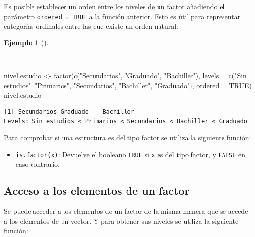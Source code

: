 \documentclass[
  a4paper,
]{scrreport}
\newenvironment{Shaded}{\begin{snugshade}}{\end{snugshade}}
\newcommand{\AttributeTok}[1]{\textcolor[rgb]{0.40,0.45,0.13}{#1}}
\newcommand{\ConstantTok}[1]{\textcolor[rgb]{0.56,0.35,0.01}{#1}}
\newcommand{\FunctionTok}[1]{\textcolor[rgb]{0.28,0.35,0.67}{#1}}
\newcommand{\NormalTok}[1]{\textcolor[rgb]{0.00,0.23,0.31}{#1}}
\newcommand{\OtherTok}[1]{\textcolor[rgb]{0.00,0.23,0.31}{#1}}
\newcommand{\StringTok}[1]{\textcolor[rgb]{0.13,0.47,0.30}{#1}}
\providecommand{\tightlist}{%
  \setlength{\itemsep}{0pt}\setlength{\parskip}{0pt}}\usepackage{longtable,booktabs,array}
\theoremstyle{definition}
\theoremstyle{definition}
\newtheorem{example}{Ejemplo}[chapter]
\theoremstyle{remark}
\begin{document}
Es posible establecer un orden entre los niveles de un factor añadiendo
el parámetro \texttt{ordered\ =\ TRUE} a la función anterior. Esto es
útil para representar categorías ordinales entre las que existe un orden
natural.

\begin{example}[]\protect\hypertarget{exm-creacion-factor-ordenado}{}\label{exm-creacion-factor-ordenado}

~

\begin{Shaded}
\begin{Highlighting}[]
\NormalTok{nivel.estudio }\OtherTok{\textless{}{-}} \FunctionTok{factor}\NormalTok{(}\FunctionTok{c}\NormalTok{(}\StringTok{"Secundarios"}\NormalTok{, }\StringTok{"Graduado"}\NormalTok{, }\StringTok{"Bachiller"}\NormalTok{), }\AttributeTok{levels =} \FunctionTok{c}\NormalTok{(}\StringTok{"Sin estudios"}\NormalTok{, }\StringTok{"Primarios"}\NormalTok{, }\StringTok{"Secundarios"}\NormalTok{, }\StringTok{"Bachiller"}\NormalTok{, }\StringTok{"Graduado"}\NormalTok{), }\AttributeTok{ordered =} \ConstantTok{TRUE}\NormalTok{)}
\NormalTok{nivel.estudio}
\end{Highlighting}
\end{Shaded}

\begin{verbatim}
[1] Secundarios Graduado    Bachiller  
Levels: Sin estudios < Primarios < Secundarios < Bachiller < Graduado
\end{verbatim}

\end{example}

Para comprobar si una estructura es del tipo factor se utiliza la
siguiente función:

\begin{itemize}
\tightlist
\item
  \texttt{is.factor(x)}: Devuelve el booleano \texttt{TRUE} si
  \texttt{x} es del tipo factor, y \texttt{FALSE} en caso contrario.
\end{itemize}

\subsection{Acceso a los elementos de un
factor}\label{acceso-a-los-elementos-de-un-factor}

Se puede acceder a los elementos de un factor de la misma manera que se
accede a los elementos de un vector. Y para obtener sus niveles se
utiliza la siguiente función:
\end{document}
